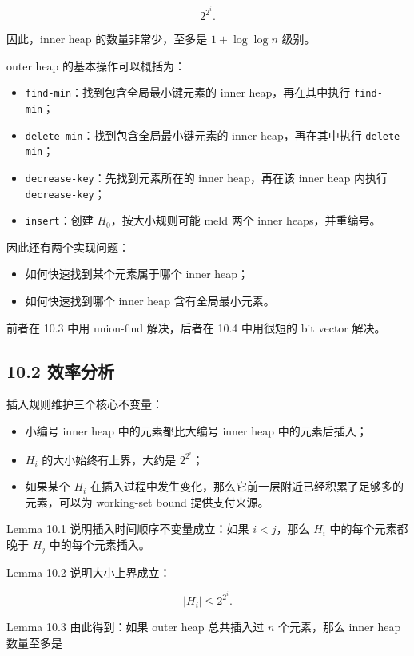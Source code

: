 \documentclass[UTF8]{ctexart}
\begin{document}
\[
2^{2^i}.
\]

因此，inner heap 的数量非常少，至多是 \(1+\log\log n\) 级别。

outer heap 的基本操作可以概括为：

\begin{itemize}
  \item \texttt{find-min}：找到包含全局最小键元素的 inner heap，再在其中执行 \texttt{find-min}；
  \item \texttt{delete-min}：找到包含全局最小键元素的 inner heap，再在其中执行 \texttt{delete-min}；
  \item \texttt{decrease-key}：先找到元素所在的 inner heap，再在该 inner heap 内执行 \texttt{decrease-key}；
  \item \texttt{insert}：创建 \(H_0\)，按大小规则可能 meld 两个 inner heaps，并重编号。
\end{itemize}

因此还有两个实现问题：

\begin{itemize}
  \item 如何快速找到某个元素属于哪个 inner heap；
  \item 如何快速找到哪个 inner heap 含有全局最小元素。
\end{itemize}

前者在 10.3 中用 union-find 解决，后者在 10.4 中用很短的 bit vector 解决。

\subsection*{10.2 效率分析}

插入规则维护三个核心不变量：

\begin{itemize}
  \item 小编号 inner heap 中的元素都比大编号 inner heap 中的元素后插入；
  \item \(H_i\) 的大小始终有上界，大约是 \(2^{2^i}\)；
  \item 如果某个 \(H_i\) 在插入过程中发生变化，那么它前一层附近已经积累了足够多的元素，可以为 working-set bound 提供支付来源。
\end{itemize}

Lemma 10.1 说明插入时间顺序不变量成立：如果 \(i<j\)，那么 \(H_i\) 中的每个元素都晚于 \(H_j\) 中的每个元素插入。

Lemma 10.2 说明大小上界成立：

\[
|H_i|\le 2^{2^i}.
\]

Lemma 10.3 由此得到：如果 outer heap 总共插入过 \(n\) 个元素，那么 inner heap 数量至多是
\end{document}
